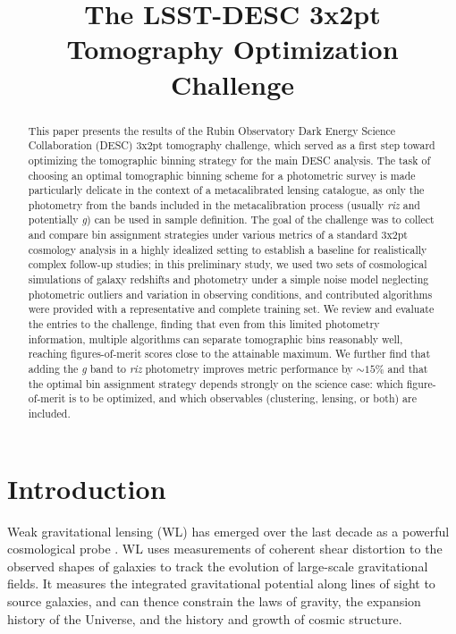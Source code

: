 \documentclass[twocolumn,twocolappendix]{aastex63}
\begin{document}
\title{The LSST-DESC 3x2pt Tomography Optimization Challenge}


\begin{abstract}
This paper presents the results of the Rubin Observatory Dark Energy Science Collaboration (DESC) 3x2pt tomography challenge, which served as a first step toward optimizing the tomographic binning strategy for the main DESC analysis. 
The task of choosing an optimal tomographic binning scheme for a photometric survey is made particularly delicate in the context of a metacalibrated lensing catalogue, as only the photometry from the bands included in the metacalibration process (usually {\em riz} and potentially {\em g}) can be used in sample definition.
The goal of the challenge was to collect and compare bin assignment strategies under various metrics of a standard 3x2pt cosmology analysis in a highly idealized setting to establish a baseline for realistically complex follow-up studies; 
in this preliminary study, we used two sets of cosmological simulations of galaxy redshifts and photometry under a simple noise model neglecting photometric outliers and variation in observing conditions, and contributed algorithms were provided with a representative and complete training set.
We review and evaluate the entries to the challenge, finding that even from this limited photometry information, multiple algorithms can separate tomographic bins reasonably well, reaching figures-of-merit scores close to the attainable maximum.
We further find that adding the \emph{g} band to \emph{riz} photometry improves metric performance by $\sim15\%$ and that the optimal bin assignment strategy depends strongly on the science case: which figure-of-merit is to be optimized, and which observables (clustering, lensing, or both) are included.
\end{abstract}




\section{Introduction}
Weak gravitational lensing (WL) has emerged over the last decade as a powerful
cosmological probe \citep{cfhtlens,rcslens,des,kids,hsc}.  WL
uses measurements of coherent shear distortion to the observed shapes of galaxies
to track the evolution of large-scale gravitational fields.  It measures the integrated
gravitational potential along lines of sight to source galaxies, and can thence constrain
the laws of gravity, the expansion history of the Universe, and the history and growth
of cosmic structure.
\end{document}
